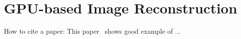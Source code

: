 \chapter{GPU-based Image Reconstruction}
How to cite a paper:  This paper~\cite{ordonez2017real} shows good example of ... 




























